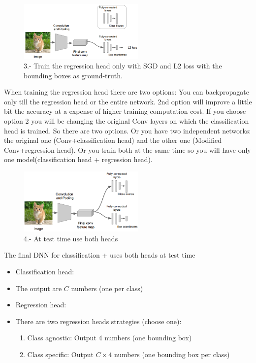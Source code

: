 \begin{figure}[h]
  \centering
  \includegraphics[width=0.55\textwidth]{Images/applications/4.png}
  \caption{3.- Train the regression head only with SGD and L2 loss with the bounding boxes as ground-truth.}
\end{figure}


When training the regression head there are two options: You can backpropagate only till the regression head or the entire network. 2nd option will improve a little bit the accuracy at a expense of higher training computation cost. If you choose option 2 you will be changing the original Conv layers on which the classification head is trained. So there are two options. Or you have two independent networks: the original one (Conv+classification head) and the other one (Modified Conv+regression head). Or you train both at the same time so you will have only one model(classification head + regression head).

\begin{figure}[h]
  \centering
  \includegraphics[width=0.55\textwidth]{Images/applications/5.png}
  \caption{4.- At test time use both heads}
\end{figure}


The final DNN for classification + uses both heads at test time
\begin{itemize}
\item Classification head:
\item The output are $C$ numbers (one per class)
\item Regression head:
\item There are two regression heads strategies (choose one):
\begin{enumerate}
    \item Class agnostic: Output 4 numbers (one bounding box)
    \item Class specific: Output $C \times 4$ numbers (one bounding box per class)
\end{enumerate}
\end{itemize}

